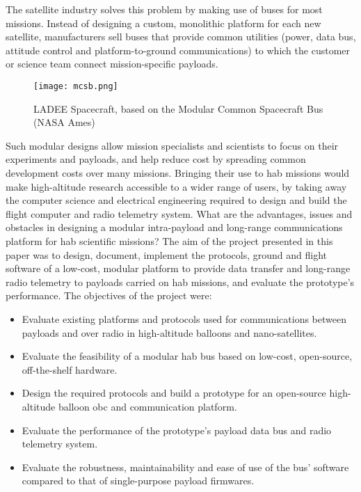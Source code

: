 The satellite industry solves this problem by making use of buses for most missions. Instead of designing a custom, monolithic platform for each new satellite, manufacturers sell buses that provide common utilities (power, data bus, attitude control and platform-to-ground communications) to which the customer or science team connect mission-specific payloads.

\begin{figure}[H]
\texttt{[image: mcsb.png]}
\centering
\caption{LADEE Spacecraft, based on the Modular Common Spacecraft Bus (NASA
Ames)}
\end{figure}

Such modular designs allow mission specialists and scientists to focus on their experiments and payloads, and help reduce cost by spreading common development costs over many missions. Bringing their use to \acrshort{hab} missions would make high-altitude research accessible to a wider range of users, by taking away the computer science and electrical engineering required to design and build the flight computer and radio telemetry system.
\vskip 0.5cm
What are the advantages, issues and obstacles in designing a modular intra-payload and long-range communications platform for \acrlong{hab} scientific missions? The aim of the project presented in this paper was to design, document, implement the protocols, ground and flight software of a low-cost, modular platform to provide data transfer and long-range radio telemetry to payloads carried on \acrlong{hab} missions, and evaluate the prototype's performance. The objectives of the project were:

\begin{itemize}
\item Evaluate existing platforms and protocols used for communications between
payloads and over radio in high-altitude balloons and nano-satellites.

\item Evaluate the feasibility of a modular \acrlong{hab} bus based on low-cost, open-source, off-the-shelf hardware.

\item Design the required protocols and build a prototype for an open-source high-altitude balloon \acrlong{obc} and communication platform.

\item Evaluate the performance of the prototype's payload data bus and radio telemetry system.

\item Evaluate the robustness, maintainability and ease of use of the bus' software compared to that of single-purpose payload firmwares.
\end{itemize}


